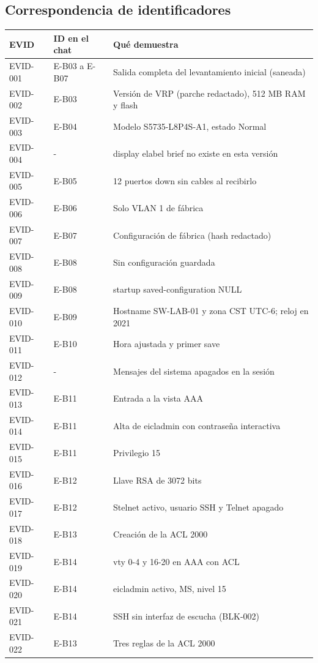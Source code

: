 \documentclass[11pt,a4paper]{article}
\newcommand{\cab}{\rowcolor{light}}
\begin{document}
\subsection*{Correspondencia de identificadores}
{\footnotesize\setlength{\tabcolsep}{4pt}
\begin{longtable}{L{1.6cm} L{2.1cm} L{11.6cm}}
  \toprule
  \cab\textbf{EVID} & \textbf{ID en el chat} & \textbf{Qué demuestra}\\
  \midrule
  \endhead
  EVID-001 & E-B03 a E-B07 & Salida completa del levantamiento inicial (saneada)\\
  EVID-002 & E-B03 & Versión de VRP (parche redactado), 512 MB RAM y flash\\
  EVID-003 & E-B04 & Modelo S5735-L8P4S-A1, estado Normal\\
  EVID-004 & - & display elabel brief no existe en esta versión\\
  EVID-005 & E-B05 & 12 puertos down sin cables al recibirlo\\
  EVID-006 & E-B06 & Solo VLAN 1 de fábrica\\
  EVID-007 & E-B07 & Configuración de fábrica (hash redactado)\\
  EVID-008 & E-B08 & Sin configuración guardada\\
  EVID-009 & E-B08 & startup saved-configuration NULL\\
  EVID-010 & E-B09 & Hostname SW-LAB-01 y zona CST UTC-6; reloj en 2021\\
  EVID-011 & E-B10 & Hora ajustada y primer save\\
  EVID-012 & - & Mensajes del sistema apagados en la sesión\\
  EVID-013 & E-B11 & Entrada a la vista AAA\\
  EVID-014 & E-B11 & Alta de eicladmin con contraseña interactiva\\
  EVID-015 & E-B11 & Privilegio 15\\
  EVID-016 & E-B12 & Llave RSA de 3072 bits\\
  EVID-017 & E-B12 & Stelnet activo, usuario SSH y Telnet apagado\\
  EVID-018 & E-B13 & Creación de la ACL 2000\\
  EVID-019 & E-B14 & vty 0-4 y 16-20 en AAA con ACL\\
  EVID-020 & E-B14 & eicladmin activo, MS, nivel 15\\
  EVID-021 & E-B14 & SSH sin interfaz de escucha (BLK-002)\\
  EVID-022 & E-B13 & Tres reglas de la ACL 2000\\

\end{longtable}}
\end{document}
